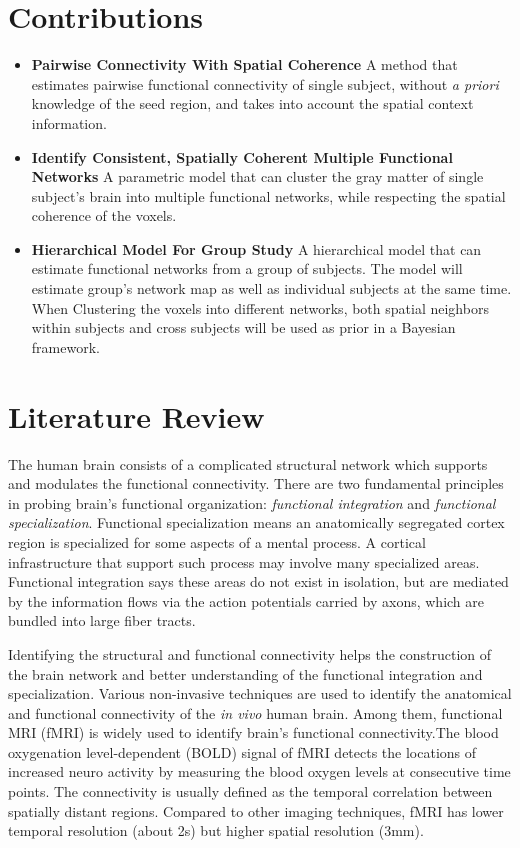 \documentclass[12pt]{article}
\begin{document}
\section{Contributions}
\begin{itemize}
  \item \textbf{Pairwise Connectivity With Spatial Coherence}
    A method that estimates pairwise functional connectivity of single subject,
    without \emph{a priori} knowledge of the seed region, and takes into account
    the spatial context information.

  \item \textbf{Identify Consistent, Spatially Coherent Multiple Functional Networks}
    A parametric model that can cluster the gray matter of single subject's
    brain into multiple functional networks, while respecting the spatial
    coherence of the voxels.

  \item \textbf{Hierarchical Model For Group Study}
    A hierarchical model that can estimate functional networks from a group
    of subjects. The model will estimate group's network map as
    well as individual subjects at the same time. When Clustering the voxels into
    different networks, both spatial neighbors within subjects and cross
    subjects will be used as prior in a Bayesian framework.
\end{itemize}

\section{Literature Review}

The human brain consists of a complicated structural network which supports and
modulates the functional connectivity. There are two fundamental principles in
probing brain's functional organization: \emph{functional integration} and
\emph{functional specialization}. Functional specialization means an
anatomically segregated cortex region is specialized for some aspects of a
mental process. A cortical infrastructure that support such process may involve
many specialized areas. Functional integration says these areas do not exist in
isolation, but are mediated by the information flows via the action potentials
carried by axons, which are bundled into large fiber tracts.

Identifying the structural and functional connectivity helps the construction of
the brain network and better understanding of the functional integration and
specialization. Various non-invasive techniques are used to identify the
anatomical and functional connectivity of the \emph{in vivo} human brain. Among
them, functional MRI (fMRI) is widely used to identify brain's functional
connectivity.The blood oxygenation level-dependent (BOLD) signal of fMRI detects
the locations of increased neuro activity by measuring the blood oxygen levels
at consecutive time points. The connectivity is usually defined as the temporal
correlation between spatially distant regions. Compared to other imaging
techniques, fMRI has lower temporal resolution (about 2s) but higher spatial
resolution (3mm).
\end{document}

